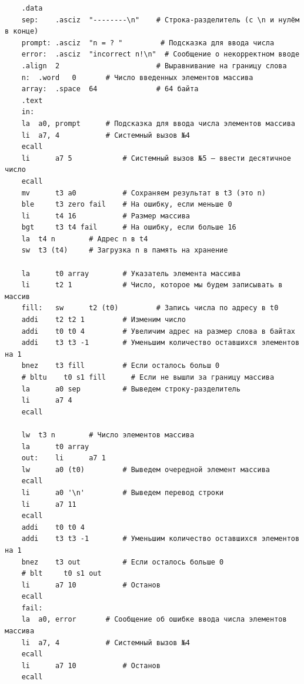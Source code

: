 \begin{verbatim}
    .data
    sep:    .asciz  "--------\n"    # Строка-разделитель (с \n и нулём в конце)
    prompt: .asciz  "n = ? "         # Подсказка для ввода числа
    error:  .asciz  "incorrect n!\n"  # Сообщение о некорректном вводе
    .align  2                       # Выравнивание на границу слова
    n:	.word	0		# Число введенных элементов массива
    array:  .space  64              # 64 байта
    .text
    in:
    la 	a0, prompt      # Подсказка для ввода числа элементов массива
    li 	a7, 4           # Системный вызов №4
    ecall
    li      a7 5            # Системный вызов №5 — ввести десятичное число
    ecall
    mv      t3 a0           # Сохраняем результат в t3 (это n)
    ble     t3 zero fail    # На ошибку, если меньше 0
    li      t4 16           # Размер массива
    bgt     t3 t4 fail      # На ошибку, если больше 16
    la	t4 n		# Адрес n в t4
    sw	t3 (t4)		# Загрузка n в память на хранение

    la      t0 array        # Указатель элемента массива
    li      t2 1            # Число, которое мы будем записывать в массив
    fill:   sw      t2 (t0)         # Запись числа по адресу в t0
    addi    t2 t2 1         # Изменим число
    addi    t0 t0 4         # Увеличим адрес на размер слова в байтах
    addi    t3 t3 -1        # Уменьшим количество оставшихся элементов на 1
    bnez    t3 fill         # Если осталось больш 0
    # bltu    t0 s1 fill      # Если не вышли за границу массива
    la      a0 sep          # Выведем строку-разделитель
    li      a7 4
    ecall

    lw	t3 n		# Число элементов массива
    la      t0 array
    out:    li      a7 1
    lw      a0 (t0)         # Выведем очередной элемент массива
    ecall
    li      a0 '\n'         # Выведем перевод строки
    li      a7 11
    ecall
    addi    t0 t0 4
    addi    t3 t3 -1        # Уменьшим количество оставшихся элементов на 1
    bnez    t3 out          # Если осталось больше 0
    # blt     t0 s1 out
    li      a7 10           # Останов
    ecall
    fail:
    la 	a0, error       # Сообщение об ошибке ввода числа элементов массива
    li 	a7, 4           # Системный вызов №4
    ecall
    li      a7 10           # Останов
    ecall
\end{verbatim}


